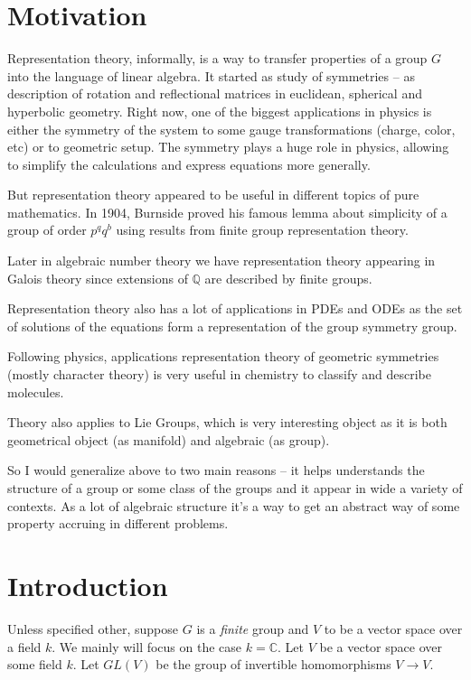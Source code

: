 \documentclass{amsart}
\author{M. Tikhonov}
\begin{document}
\newtheorem{definition}{Definition}
\newtheorem{note}{Note}
\newtheorem{lemma}{Lemma}
\newtheorem{theorem}{Theorem}
\newtheorem{example}{Ex.}
\newtheorem{claim}{Claim}

\section{Motivation}

Representation theory, informally, is a way to transfer properties of a group $G$  into the language of linear algebra. 
It started as study of symmetries -- as description of rotation and reflectional matrices in euclidean, spherical and hyperbolic geometry. 
Right now, one of the biggest applications in physics is either the symmetry of the system to some gauge transformations (charge, color, etc) or to geometric setup. 
The symmetry plays a huge role in physics, allowing to simplify the calculations and express equations more generally.

But representation theory appeared to be useful in different topics of pure mathematics.  
In 1904, Burnside proved his famous lemma about simplicity of a group of order $p^q q^b$ using results from finite group representation theory.

Later in algebraic number theory we have representation theory appearing in Galois theory since extensions of $\mathbb{Q}$ are described by finite groups.

Representation theory also has a lot of applications in PDEs and ODEs as the set of solutions of the equations form a representation of the group symmetry group.

Following physics, applications representation theory of geometric symmetries (mostly character theory) is very useful in chemistry to classify and describe molecules.

Theory also applies to Lie Groups, which is very interesting object as it is both geometrical object (as manifold) and algebraic (as group).

So I would generalize above to two main reasons -- it helps understands the structure of a group or some class of the groups and it appear in wide a variety of contexts.
As a lot of algebraic structure it's a way to get an abstract way of some property accruing in different problems.

\section{Introduction}
Unless specified other, suppose $G$ is a \textit{finite} group and $V$ to be a vector space over a field $k$. We mainly will focus on the case $k=\mathbb{C}$.
Let $V$ be a vector space over some field $k$. Let $GL(V)$ be the group of invertible homomorphisms $V \to V$.
\end{document}
